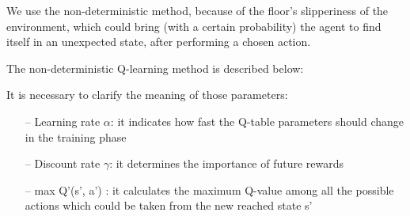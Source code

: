 \documentclass{article}
\begin{document}
\begin{center}
\centering
{}
\end{center}

We use the non-deterministic method, because of the floor's slipperiness of the environment, which could bring (with a certain probability) the agent to find itself in an unexpected state, after performing a chosen action.

The non-deterministic Q-learning method is described below:

\begin{center}
\centering
{}
\end{center}

It is necessary to clarify the meaning of those parameters:

\begin{itemize}
\item[--]{Learning rate $\alpha$: it indicates how fast the Q-table parameters should change in the training phase}
\item[--]{Discount rate $\gamma$: it determines the importance of future rewards}
\item[--] {max Q'(s', a') : it calculates the maximum Q-value among all the possible actions which could be taken from the new reached state s'}
\end{itemize}
\end{document}
